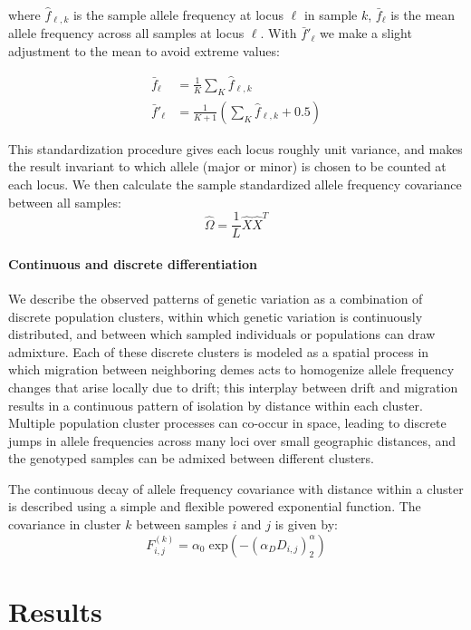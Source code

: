 \documentclass[12pt]{article}
\begin{document}
where $\hat{f}_{\ell,k}$ is the sample allele frequency at locus $\ell$ in sample $k$,
$\bar{f}_{\ell}$ is the mean allele frequency across all samples at locus $\ell$.
With $\bar{f}'_{\ell}$ we make a slight adjustment to the mean to avoid extreme values:

\begin{align}
\bar{f}_{\ell} &= \frac{1}{K}\sum\limits_{K}\hat{f}_{\ell,k}\\
\bar{f}'_{\ell} &= \frac{1}{K+1}\left(\sum\limits_{K}\hat{f}_{\ell,k}+ 0.5\right)
\end{align}

This standardization procedure gives each locus roughly unit variance, 
and makes the result invariant to which allele (major or minor) is chosen to be counted at each locus.
We then calculate the sample standardized allele frequency covariance between all samples:
\begin{equation}
\widehat{\Omega} = \frac{1}{L}  \hat{X}\hat{X}^T
\end{equation}

\paragraph{Continuous and discrete differentiation}
We describe the observed patterns of genetic variation as a combination of discrete population clusters,
within which genetic variation is continuously distributed, 
and between which sampled individuals or populations can draw admixture.
Each of these discrete clusters is modeled as a spatial process
in which migration between neighboring demes acts 
to homogenize allele frequency changes that arise locally due to drift;
this interplay between drift and migration 
results in a continuous pattern of isolation by distance within each cluster.
Multiple population cluster processes can co-occur in space, 
leading to discrete jumps in allele frequencies across many loci over small geographic distances,
and the genotyped samples can be admixed between different clusters.

The continuous decay of allele frequency covariance with distance 
within a cluster is described using a simple and flexible powered exponential function.
The covariance in cluster $k$ between samples $i$ and $j$ is given by:
\begin{equation}
F^{(k)}_{i,j} = \alpha_0 \;\text{exp} \left( -(\alpha_D D_{i,j}) ^ \alpha_2	\right)
\end{equation}


\section*{Results}
\end{document}

